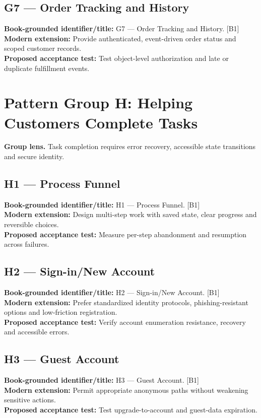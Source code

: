 \documentclass[11pt]{article}
\begin{document}
\subsection{G7 — Order Tracking and History}
\noindent\textcolor{Ocean}{\textbf{Book-grounded identifier/title:}} G7 — Order Tracking and History. [B1]\\
\textcolor{Mint}{\textbf{Modern extension:}} Provide authenticated, event-driven order status and scoped customer records.\\
\textcolor{Amber}{\textbf{Proposed acceptance test:}} Test object-level authorization and late or duplicate fulfillment events.\medskip
\section{Pattern Group H: Helping Customers Complete Tasks}

\begin{notebox}\textbf{Group lens.} Task completion requires error recovery, accessible state transitions and secure identity.\end{notebox}
\subsection{H1 — Process Funnel}
\noindent\textcolor{Ocean}{\textbf{Book-grounded identifier/title:}} H1 — Process Funnel. [B1]\\
\textcolor{Mint}{\textbf{Modern extension:}} Design multi-step work with saved state, clear progress and reversible choices.\\
\textcolor{Amber}{\textbf{Proposed acceptance test:}} Measure per-step abandonment and resumption across failures.\medskip
\subsection{H2 — Sign-in/New Account}
\noindent\textcolor{Ocean}{\textbf{Book-grounded identifier/title:}} H2 — Sign-in/New Account. [B1]\\
\textcolor{Mint}{\textbf{Modern extension:}} Prefer standardized identity protocols, phishing-resistant options and low-friction registration.\\
\textcolor{Amber}{\textbf{Proposed acceptance test:}} Verify account enumeration resistance, recovery and accessible errors.\medskip
\subsection{H3 — Guest Account}
\noindent\textcolor{Ocean}{\textbf{Book-grounded identifier/title:}} H3 — Guest Account. [B1]\\
\textcolor{Mint}{\textbf{Modern extension:}} Permit appropriate anonymous paths without weakening sensitive actions.\\
\textcolor{Amber}{\textbf{Proposed acceptance test:}} Test upgrade-to-account and guest-data expiration.\medskip
\end{document}

